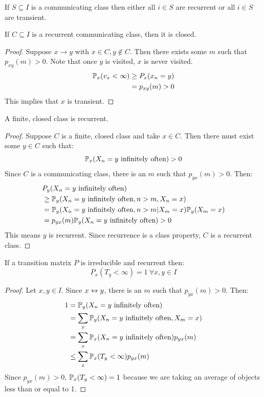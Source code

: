\documentclass[../Main.tex]{subfiles}
\begin{document}
\begin{corollary}
    If $S \subseteq I$ is a communicating class then either all $i \in S$ are recurrent or all $i \in S$ are transient.
    \label{corComClassRecur}
\end{corollary}
\begin{theorem}
    If $C \subseteq I$ is a recurrent communicating class, then it is closed.
    \label{thmRecurCommClosed}
\end{theorem}
\begin{proof}
    Suppose $x \to y$ with $x \in C, y \notin C$. Then there exists some $m$ such that $p_{xy}(m) > 0$. Note that once $y$ is visited, $x$ is never visited.
    \begin{align*}
        \P_x(v_x < \infty) &\geq P_x(x_n = y) \\
        &= p_{xy}(m) > 0
    \end{align*}
    This implies that $x$ is transient.\contradiction
\end{proof}
\begin{theorem}
    A finite, closed class is recurrent.
    \label{thmFinClosedRecurr}
\end{theorem}
\begin{proof}
    Suppose $C$ is a finite, closed class and take $x \in C$. Then there must exist some $y \in C$ such that:
    \begin{equation*}
        \P_x(X_n = y \io) > 0
    \end{equation*}
    Since $C$ is a communicating class, there is an $m$ such that $p_{yx}(m) > 0$. Then:
    \begin{align*}
        &P_y(X_n = y \io)\\
        &\geq \P_y(X_n = y \io, n > m, X_n = x) \\
        &= \P_y(X_n = y \io, n > m | X_m = x) \P_y(X_m = x) \\
        &= p_{yx}(m) \P_y(X_n = y \io) > 0
    \end{align*}
    This means $y$ is recurrent. Since recurrence is a class property, $C$ is a recurrent class.
\end{proof}
\begin{theorem}
    If a transition matrix $P$ is irreducible and recurrent then:
    \begin{equation*}
        P_x(T_y < \infty) = 1~\forall x, y \in I
    \end{equation*}
    \label{thmRecurHittingTime}
\end{theorem}
\begin{proof}
    Let $x, y \in I$. Since $x \comms y$, there is an $m$ such that $p_{yx}(m) > 0$. Then:
    \begin{align*}
        1 &= \P_y(X_n = y \io) \\
        &= \sum_x \P_y(X_n = y \io, X_m = x) \\
        &= \sum_x \P_x(X_n = y \io) p_{yx}(m) \\
        &\leq \sum_x \P_x(T_y < \infty)p_{yx}(m)
    \end{align*}
    Since $p_{yx}(m) > 0$, $\P_x(T_y < \infty) = 1$ because we are taking an average of objects less than or equal to 1.
\end{proof}
\end{document}
